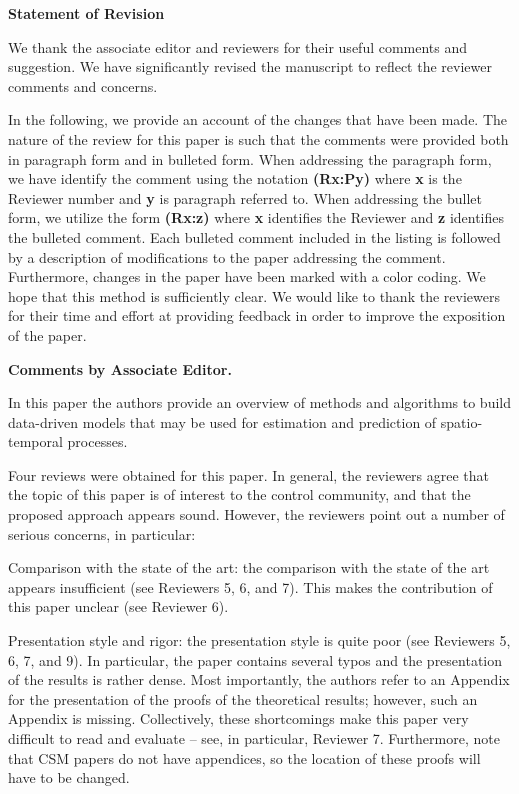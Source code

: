 \documentclass{letter}
\begin{document}
\centerline{{\bf \large Statement of Revision}}

We thank the associate editor and reviewers for their useful comments and suggestion. We have significantly revised the manuscript to reflect the reviewer comments and concerns.

In the following, we provide an account of the changes that have been made.  The nature of
the review for this paper is such that the comments were provided both
in paragraph form and in bulleted form.  When addressing the paragraph
form, we have identify the comment using the notation {\bf {\color{red}(Rx:Py)}} where 
{\bf x} is the Reviewer number and {\bf y} is paragraph referred to.
When addressing the bullet form, we utilize the form {\bf (Rx:z)} where
{\bf x} identifies the Reviewer and {\bf z} identifies the bulleted comment.
Each bulleted comment included in the listing is followed by a description
of modifications to the paper addressing the comment. Furthermore, changes in the paper have been marked with a color coding.  We hope that this
method is sufficiently clear.
We would like to thank the reviewers for their time and effort at providing
feedback in order to improve the exposition of the paper.

{\bf Comments by Associate Editor.}

In this paper the authors provide an overview of methods and algorithms
to build data-driven models that may be used for estimation and
prediction of spatio-temporal processes. 

Four reviews were obtained for this paper. In general, the reviewers
agree that the topic of this paper is of interest to the control
community, and that the proposed approach appears sound. However, the
reviewers point out a number of serious concerns, in particular:

Comparison with the state of the art: the comparison with the state
of the art appears insufficient (see Reviewers 5, 6, and 7). This makes
the contribution of this paper unclear (see Reviewer 6).

Presentation style and rigor: the presentation style is quite poor
(see Reviewers 5, 6, 7, and 9). In particular, the paper contains
several typos and the presentation of the results is rather dense. Most
importantly, the authors refer to an Appendix for the presentation of
the proofs of the theoretical results; however, such an Appendix is
missing. Collectively, these shortcomings make this paper very
difficult to read and evaluate -- see, in particular, Reviewer 7.
Furthermore, note that CSM papers do not have appendices, 
so the location of these proofs will have to be changed.
\end{document}
